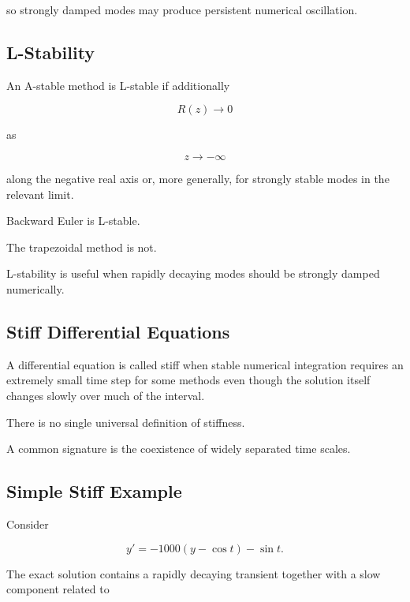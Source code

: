 so strongly damped modes may produce persistent numerical oscillation.

\subsection{L-Stability}
\label{subsec:l-stability}

An A-stable method is L-stable if additionally

\[
\boxed{
R(z)\to0
}
\]

as

\[
z\to-\infty
\]

along the negative real axis or, more generally, for strongly stable
modes in the relevant limit.

Backward Euler is L-stable.

The trapezoidal method is not.

L-stability is useful when rapidly decaying modes should be strongly
damped numerically.

\subsection{Stiff Differential Equations}
\label{subsec:stiff-odes}

A differential equation is called stiff when stable numerical integration
requires an extremely small time step for some methods even though the
solution itself changes slowly over much of the interval.

There is no single universal definition of stiffness.

A common signature is the coexistence of widely separated time scales.

\subsection{Simple Stiff Example}
\label{subsec:simple-stiff-example}

Consider

\[
\boxed{
y'
=
-1000
(
y-\cos t
)
-
\sin t.
}
\]

The exact solution contains a rapidly decaying transient together with a
slow component related to

